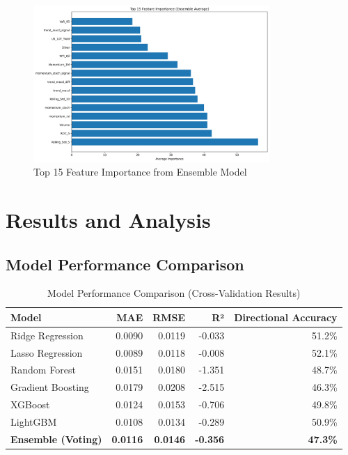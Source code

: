 \documentclass[12pt,a4paper]{article}
\begin{document}
\begin{figure}[H]
\centering
\includegraphics[width=0.8\textwidth]{ensemble_feature_importance.png}
\caption{Top 15 Feature Importance from Ensemble Model}
\label{fig:feature_importance}
\end{figure}

\section{Results and Analysis}

\subsection{Model Performance Comparison}

\begin{table}[H]
\centering
\caption{Model Performance Comparison (Cross-Validation Results)}
\label{tab:model_comparison}
\begin{tabular}{@{}lrrrr@{}}
\toprule
Model & MAE & RMSE & R² & Directional Accuracy \\
\midrule
Ridge Regression & 0.0090 & 0.0119 & -0.033 & 51.2\% \\
Lasso Regression & 0.0089 & 0.0118 & -0.008 & 52.1\% \\
Random Forest & 0.0151 & 0.0180 & -1.351 & 48.7\% \\
Gradient Boosting & 0.0179 & 0.0208 & -2.515 & 46.3\% \\
XGBoost & 0.0124 & 0.0153 & -0.706 & 49.8\% \\
LightGBM & 0.0108 & 0.0134 & -0.289 & 50.9\% \\
\textbf{Ensemble (Voting)} & \textbf{0.0116} & \textbf{0.0146} & \textbf{-0.356} & \textbf{47.3\%} \\
\bottomrule
\end{tabular}
\end{table}
\end{document}
